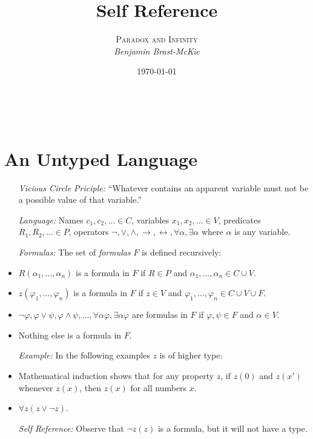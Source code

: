 \documentclass[a4paper, 11pt]{article} %
\title{\textbf{Self Reference}} %
\author{\textsc{Paradox and Infinity}\\ \em Benjamin Brast-McKie} %
\date{\today} %
\makeatletter
\renewcommand{\maketitle}{ %
\begin{flushright} %
{\LARGE\@title} %

\vspace{10pt} %

{\@author} %
\\\@date %

\vspace{-10pt} %
\end{flushright}
}
\makeatother
\begin{document}
\maketitle %

\thispagestyle{empty}



\section*{An Untyped Language}

  \begin{itemize}
    \item[\it Vicious Circle Priciple:] ``Whatever contains an apparent variable must not be a possible value of that variable.''
    \item[\it Language:] Names $c_1,c_2,\ldots \in C$, variables $x_1,x_2,\ldots \in V$, predicates $R_1,R_2,\ldots \in P$, operators $\neg,\vee,\wedge,\rightarrow,\leftrightarrow,\forall\alpha,\exists\alpha$ where $\alpha$ is any variable. 
    \item[\it Formulas:] The set of \textit{formulas} $F$ is defined recursively:
      \item $R(\alpha_1,\ldots,\alpha_n)$ is a formula in $F$ if $R \in P$ and $\alpha_1,\ldots,\alpha_n \in C \cup V$.
      \item $z(\varphi_1,\ldots,\varphi_n)$ is a formula in $F$ if $z \in V$ and $\varphi_1,\ldots,\varphi_n \in C\cup V\cup F$. 
      \item $\neg \varphi, \varphi \vee \psi, \varphi \wedge \psi, \ldots, \forall \alpha \varphi, \exists \alpha \varphi$ are formulas in $F$ if $\varphi,\psi \in F$ and $\alpha \in V$. 
      \item Nothing else is a formula in $F$.
    \item[\it Example:] In the following examples $z$ is of higher type: 
      \item Mathematical induction shows that for any property $z$, if $z(0)$ and $z(x')$ whenever $z(x)$, then $z(x)$ for all numbers $x$. 
      \item $\forall z(z \vee \neg z)$.
    \item[\it Self Reference:] Observe that $\neg z(z)$ is a formula, but it will not have a type. 
  \end{itemize}
\end{document}

